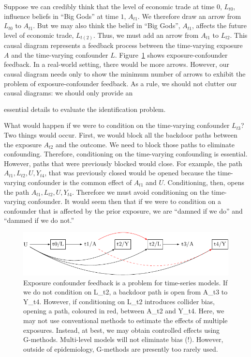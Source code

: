 \documentclass[
  singlecolumn]{article}
\begin{document}
Suppose we can credibly think that the level of economic trade at time
\(0\), \(L_{t0}\), influence beliefs in ``Big Gods'' at time \(1\),
\(A_{t1}\). We therefore draw an arrow from \(L_{t0}\) to \(A_{t1}\).
But we may also think the belief in ``Big Gods'', \(A_{t1}\), affects
the future level of economic trade, \(L_{t(2)}\). Thus, we must add an
arrow from \(A_{t1}\) to \(L_{t2}\). This causal diagram represents a
feedback process between the time-varying exposure \(A\) and the
time-varying confounder \(L\). Figure~\ref{fig-dag-9} shows
exposure-confounder feedback. In a real-world setting, there would be
more arrows. However, our causal diagram needs only to show the minimum
number of arrows to exhibit the problem of exposure-confounder feedback.
As a rule, we should not clutter our causal diagrams: we should only
provide an

essential details to evaluate the identification problem.

What would happen if we were to condition on the time-varying confounder
\(L_{t3}\)? Two things would occur. First, we would block all the
backdoor paths between the exposure \(A_{t2}\) and the outcome. We need
to block those paths to eliminate confounding. Therefore, conditioning
on the time-varying confounding is essential. However, paths that were
previously blocked would close. For example, the path
\(A_{t1}, L_{t2}, U, Y_{t4}\), that was previously closed would be
opened because the time-varying confounder is the common effect of
\(A_{t1}\) and \(U\). Conditioning, then, opens the path
\(A_{t1}, L_{t2}, U, Y_{t4}\). Therefore we must avoid conditioning on
the time-varying confounder. It would seem then that if we were to
condition on a confounder that is affected by the prior exposure, we are
``damned if we do'' and ``dammed if we do not.''

\begin{figure}

{\centering \includegraphics[width=1\textwidth,height=\textheight]{causal-dags_files/figure-pdf/fig-dag-9-1.pdf}

}

\caption{\label{fig-dag-9}Exposure confounder feedback is a problem for
time-series models. If we do not condition on L\_t2, a backdoor path is
open from A\_t3 to Y\_t4. However, if conditioning on L\_t2 introduces
collider bias, opening a path, coloured in red, between A\_t2 and Y\_t4.
Here, we may not use conventional methods to estimate the effects of
multiple exposures. Instead, at best, we may obtain controlled effects
using G-methods. Multi-level models will not eliminate bias (!).
However, outside of epidemiology, G-methods are presently too rarely
used.}

\end{figure}
\end{document}
